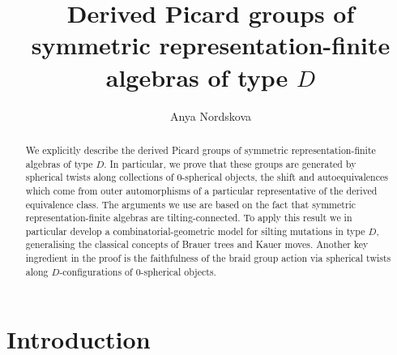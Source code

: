 \documentclass[12pt]{amsart}
\author{Anya Nordskova}
\theoremstyle{plain}
\theoremstyle{remark}
\theoremstyle{definition}
\def\P{\mathbb P}
\begin{document}
\title{Derived Picard groups of symmetric representation-finite algebras of type $D$}
\maketitle

\begin{abstract}
   We explicitly describe the derived Picard groups of symmetric representation-finite algebras of type $D$. In particular, we prove that these groups are generated by spherical twists along collections of $0$-spherical objects, the shift and autoequivalences which come from outer automorphisms of a particular representative of the derived equivalence class. The arguments we use are based on the fact that symmetric representation-finite algebras are tilting-connected. To apply this result we in particular develop a combinatorial-geometric model for silting mutations in type $D$, generalising the classical concepts of Brauer trees and Kauer moves. Another key ingredient in the proof is the faithfulness of the braid group action via spherical twists along $D$-configurations of $0$-spherical objects. \end{abstract}


\tableofcontents 

\newpage 

\section{Introduction} 

\end{document}
